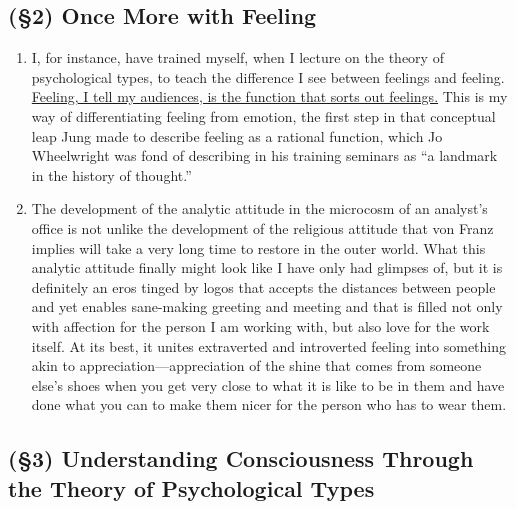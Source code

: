 \subsection{(\S2) Once More with Feeling}

\begin{enumerate}

    \item {} I, for instance, have trained myself,
        when I lecture on the theory of psychological types, to teach the
        difference I see between feelings and feeling. \ul{Feeling, I tell my
        audiences, is the function that sorts out feelings.} This is my way of
        differentiating feeling from emotion, the first step in that conceptual
        leap Jung made to describe feeling as a rational function, which Jo
        Wheelwright was fond of describing in his training seminars as “a
        landmark in the history of thought.”

    \item {} The development of the analytic attitude
        in the microcosm of an analyst's office is not unlike the development
        of the religious attitude that von Franz implies will take a very long
        time to restore in the outer world. What this analytic attitude finally
        might look like I have only had glimpses of, but it is definitely an
        eros tinged by logos that accepts the distances between people and yet
        enables sane-making greeting and meeting and that is filled not only
        with affection for the person I am working with, but also love for the
        work itself. At its best, it unites extraverted and introverted feeling
        into something akin to appreciation—appreciation of the shine that
        comes from someone else's shoes when you get very close to what it is
        like to be in them and have done what you can to make them nicer for
        the person who has to wear them.

\end{enumerate}


\subsection{(\S3) Understanding Consciousness Through the Theory of Psychological Types}

